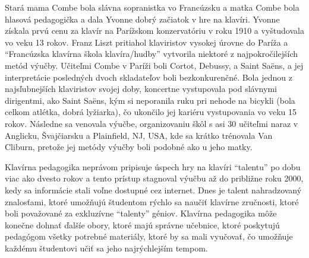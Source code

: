 \documentclass[11pt,a4paper]{book}
\begin{document}
Stará mama Combe bola slávna sopranistka vo Francúzsku a matka Combe bola hlasová pedagogička a dala Yvonne dobrý začiatok v hre na klavíri. Yvonne získala prvú cenu za klavír na Parížskom konzervatóriu v roku 1910 a vyštudovala vo veku 13 rokov. Franz Liszt pritiahol klaviristov vysokej úrovne do Paríža a “Francúzska klavírna škola klavíra/hudby” vytvorila niektoré z najpokročilejších metód výučby. Učiteľmi Combe v Paríži boli Cortot, Debussy, a Saint Saëns, a jej interpretácie posledných dvoch skladateľov boli bezkonkurenčné. Bola jednou z najsľubnejších klaviristov svojej doby, koncertne vystupovala pod slávnymi dirigentmi, ako Saint Saëns, kým si neporanila ruku pri nehode na bicykli (bola celkom atlétka, dobrá lyžiarka), čo ukončilo jej kariéru vystupovania vo veku 15 rokov. Následne sa venovala výučbe, organizovaniu škôl s asi 30 učiteľmi naraz v Anglicku, Švajčiarsku a Plainfield, NJ, USA, kde sa krátko trénovala Van Cliburn, pretože jej metódy výučby boli podobné ako u jeho matky.

Klavírna pedagogika neprávom pripisuje úspech hry na klavíri “talentu” po dobu viac ako dvesto rokov a tento prístup stagnoval výučbu až do približne roku 2000, kedy sa informácie stali voľne dostupné cez internet. Dnes je talent nahradzovaný znalosťami, ktoré umožňujú študentom rýchlo sa naučiť klavírne zručnosti, ktoré boli považované za exkluzívne “talenty” géniov. Klavírna pedagogika môže konečne dohnať ďalšíe obory, ktoré majú správne učebnice, ktoré poskytujú pedagógom všetky potrebné materiály, ktoré by sa mali vyučovať, čo umožňuje každému študentovi učiť sa jeho najrýchlejším tempom.
\end{document}

